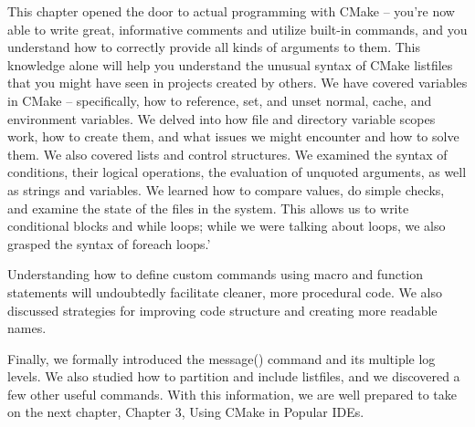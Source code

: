 This chapter opened the door to actual programming with CMake – you’re now able to write great, informative comments and utilize built-in commands, and you understand how to correctly provide all kinds of arguments to them. This knowledge alone will help you understand the unusual syntax of CMake listfiles that you might have seen in projects created by others. We have covered variables in CMake – specifically, how to reference, set, and unset normal, cache, and environment variables. We delved into how file and directory variable scopes work, how to create them, and what issues we might encounter and how to solve them. We also covered lists and control structures. We examined the syntax of conditions, their logical operations, the evaluation of unquoted arguments, as well as strings and variables. We learned how to compare values, do simple checks, and examine the state of the files in the system. This allows us to write conditional blocks and while loops; while we were talking about loops, we also grasped the syntax of foreach loops.'

Understanding how to define custom commands using macro and function statements will undoubtedly facilitate cleaner, more procedural code. We also discussed strategies for improving code structure and creating more readable names.

Finally, we formally introduced the message() command and its multiple log levels. We also studied how to partition and include listfiles, and we discovered a few other useful commands. With this information, we are well prepared to take on the next chapter, Chapter 3, Using CMake in Popular IDEs.